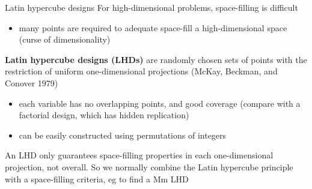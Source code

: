 \documentclass[
  ignorenonframetext,
]{beamer}
\providecommand{\tightlist}{%
  \setlength{\itemsep}{0pt}\setlength{\parskip}{0pt}}
\begin{document}
\begin{frame}{Latin hypercube designs}
\protect\hypertarget{latin-hypercube-designs}{}
For high-dimensional problems, space-filling is difficult

\begin{itemize}
\tightlist
\item
  many points are required to adequate space-fill a high-dimensional
  space (curse of dimensionality)
\end{itemize}

\textbf{Latin hypercube designs (LHDs)} are randomly chosen sets of
points with the restriction of uniform one-dimensional projections
(McKay, Beckman, and Conover 1979)

\begin{itemize}
\tightlist
\item
  each variable has no overlapping points, and good coverage (compare
  with a factorial design, which has hidden replication)
\item
  can be easily constructed using permutations of integers
\end{itemize}

An LHD only guarantees space-filling properties in each one-dimensional
projection, not overall. So we normally combine the Latin hypercube
principle with a space-filling criteria, eg to find a Mm LHD
\end{frame}
\end{document}
